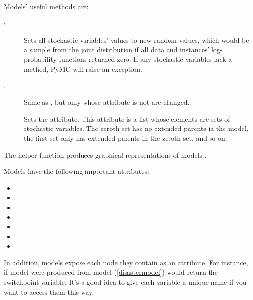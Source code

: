 Models' useful methods are:
\begin{description}
    \item[:] Sets all stochastic variables' values to new random values, which would be a sample from the joint distribution if all data and  instances' log-probability functions returned zero. If any stochastic variables lack a method, PyMC will raise an exception.
    \item[:] Same as , but only  whose  attribute is not  are changed.
    \item[] Sets the  attribute. This attribute is a list whose elements are sets of stochastic variables. The zeroth set has no extended parents in the model, the first set only has extended parents in the zeroth set, and so on.
\end{description}

The helper function  produces graphical representations of models \cite[see]{Jordan:2004p5439}.

Models have the following important attributes:
\begin{itemize}
    \item {}
    \item {}
    \item {}
    \item {}
    \item {}
    \item {}
    \item {}
\end{itemize}

In addition, models expose each node they contain as an attribute. For instance, if model  were produced from model (\ref{disastermodel})  would return the switchpoint variable. It's a good idea to give each variable a unique name if you want to access them this way.

\hypertarget{sampler}{}
